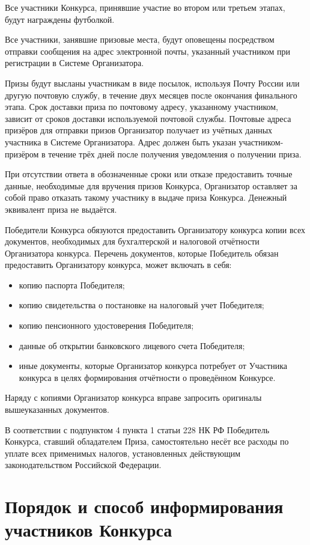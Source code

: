 Все участники Конкурса, принявшие участие во втором или третьем этапах, будут награждены футболкой.

Все участники, занявшие призовые места, будут оповещены посредством отправки сообщения на адрес электронной почты, указанный участником при
регистрации в Системе Организатора.

Призы будут высланы участникам в виде посылок, используя Почту России или другую почтовую службу, в течение двух месяцев после окончания
финального этапа. Срок доставки приза по почтовому адресу, указанному участником, зависит от сроков доставки используемой почтовой службы.
Почтовые адреса призёров для отправки призов Организатор получает из учётных данных участника в Системе Организатора. Адрес должен быть
указан участником-призёром в течение трёх дней после получения уведомления о получении приза.

При отсутствии ответа в обозначенные сроки или отказе предоставить точные данные, необходимые для вручения призов Конкурса, Организатор
оставляет за собой право отказать такому участнику в выдаче приза Конкурса. Денежный эквивалент приза не выдаётся.
 
Победители Конкурса обязуются предоставить Организатору конкурса копии всех документов, необходимых для бухгалтерской и налоговой отчётности
Организатора конкурса. Перечень документов, которые Победитель обязан предоставить Организатору конкурса, может включать в себя:
\begin{itemize}
\item копию паспорта Победителя;
\item копию свидетельства о постановке на налоговый учет Победителя;
\item копию пенсионного удостоверения Победителя;
\item данные об открытии банковского лицевого счета Победителя;
\item иные документы, которые Организатор конкурса потребует от Участника конкурса в целях формирования отчётности о проведённом Конкурсе.
\end{itemize}

Наряду с копиями Организатор конкурса вправе запросить оригиналы вышеуказанных документов.

В соответствии с подпунктом 4 пункта 1 статьи 228 НК РФ Победитель Конкурса, ставший обладателем Приза, самостоятельно несёт все расходы по
уплате всех применимых налогов, установленных действующим законодательством Российской Федерации.

\section{Порядок и способ информирования участников Конкурса}

